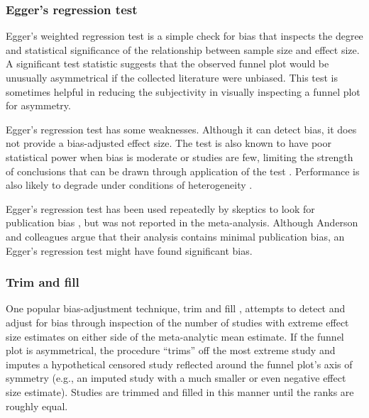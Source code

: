 \documentclass[man, mask]{apa6}
\begin{document}
\subsubsection{Egger's regression test}
Egger's weighted regression test \citep{Sterne:Egger:2005} is a simple check for bias that inspects the degree and statistical significance of the relationship between sample size and effect size. A significant test statistic suggests that the observed funnel plot would be unusually asymmetrical if the collected literature were unbiased. This test is sometimes helpful in reducing the subjectivity in visually inspecting a funnel plot for asymmetry. 

Egger's regression test has some weaknesses. Although it can detect bias, it does not provide a bias-adjusted effect size. The test is also known to have poor statistical power when bias is moderate or studies are few, limiting the strength of conclusions that can be drawn through application of the test \citep{Sterne:etal:2000}. Performance is also likely to degrade under conditions of heterogeneity \citep[e.g.,][]{Lau:etal:2006,Terrin:etal:2003}. 

Egger's regression test has been used repeatedly by skeptics to look for publication bias \citep[e.g.,][]{Ferguson:2007,Ferguson:Kilburn:2009}, but was not reported in the \citet{Anderson:etal:2010} meta-analysis. Although Anderson and colleagues argue that their analysis contains minimal publication bias, an Egger's regression test might have found significant bias.

\subsubsection{Trim and fill}
One popular bias-adjustment technique, trim and fill \citep{Duval:Tweedie:2000}, attempts to detect and adjust for bias through inspection of the number of studies with extreme effect size estimates on either side of the meta-analytic mean estimate. If the funnel plot is asymmetrical, the procedure ``trims'' off the most extreme study and imputes a hypothetical censored study reflected around the funnel plot's axis of symmetry (e.g., an imputed study with a much smaller or even negative effect size estimate). Studies are trimmed and filled in this manner until the ranks are roughly equal. 
\end{document}
